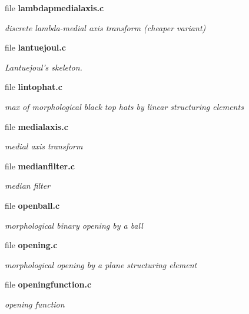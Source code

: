 \begin{CompactItemize}
\item 
file {\bf lambdapmedialaxis.c}
\begin{CompactList}\small\item\em discrete lambda-medial axis transform (cheaper variant) \item\end{CompactList}

\item 
file {\bf lantuejoul.c}
\begin{CompactList}\small\item\em Lantuejoul's skeleton. \item\end{CompactList}

\item 
file {\bf lintophat.c}
\begin{CompactList}\small\item\em max of morphological black top hats by linear structuring elements \item\end{CompactList}

\item 
file {\bf medialaxis.c}
\begin{CompactList}\small\item\em medial axis transform \item\end{CompactList}

\item 
file {\bf medianfilter.c}
\begin{CompactList}\small\item\em median filter \item\end{CompactList}

\item 
file {\bf openball.c}
\begin{CompactList}\small\item\em morphological binary opening by a ball \item\end{CompactList}

\item 
file {\bf opening.c}
\begin{CompactList}\small\item\em morphological opening by a plane structuring element \item\end{CompactList}

\item 
file {\bf openingfunction.c}
\begin{CompactList}\small\item\em opening function \item\end{CompactList}


\end{CompactItemize}
